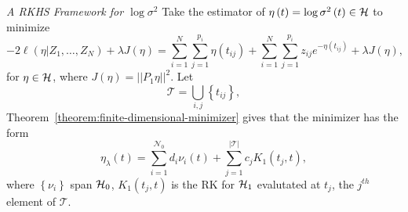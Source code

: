\begin{frame}{\textit{A RKHS Framework for $\log \sigma^2$}}
\footnotesize
Take the estimator of $\eta\left(t\right) = \log\sigma^2\left(t\right) \in \mathcal{H}$ to minimize
\begin{equation*} %
-2\ell\left( \eta \vert Z_1,\dots, Z_N \right) +\lambda J \left(\eta\right) =  \sum_{i = 1}^N \sum_{j = 1}^{p_i} \eta\left(t_{ij}\right)  + \sum_{i = 1}^N \sum_{j = 1}^{p_i} z_{ij} e^{-\eta\left(t_{ij}\right)} + \lambda J\left(\eta\right),  
\end{equation*}
\noindent
for $\eta \in \mathcal{H}$, where $J\left(\eta\right) =\vert \vert P_1 \eta \vert\vert^2$. Let 
 \[
 \mathcal{T} = \bigcup_{i,j} \left\{t_{ij}\right\},
 \]
 Theorem~\ref{theorem:finite-dimensional-minimizer} gives that the minimizer has the form 
\begin{equation*}%
\eta_\lambda\left( t \right) = \sum_{i = 1}^{\mathcal{N}_0} d_i \nu_i\left( t \right) + \sum_{j = 1}^{\vert \mathcal{T} \vert} c_j K_1\left(t_j,t\right),
\end{equation*}  
\noindent
where $\left\{\nu_i \right\}$ span $\mathcal{H}_0$, $K_1\left(t_j,t\right)$ is the RK for $\mathcal{H}_1$ evalutated at ${t_j}$, the $j^{th}$ element of $\mathcal{T}$.

\end{frame}

